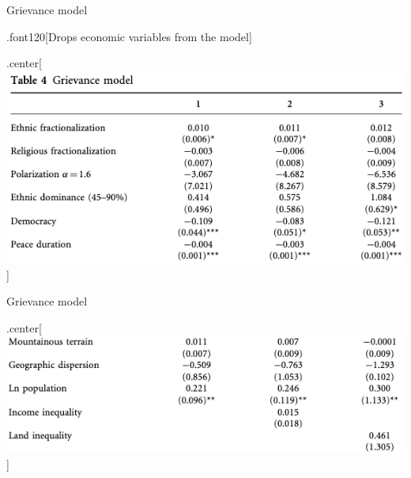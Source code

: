 \documentclass[ignorenonframetext,]{beamer}
\begin{document}
\begin{frame}{Grievance model}

.font120{[}Drops economic variables from the model{]}

\begin{block}{.center{[}\includegraphics{ch03.png}{]}}

\end{block}

\end{frame}

\begin{frame}{Grievance model}

\begin{block}{.center{[}\includegraphics{ch04.png}{]}}

\end{block}

\end{frame}
\end{document}
